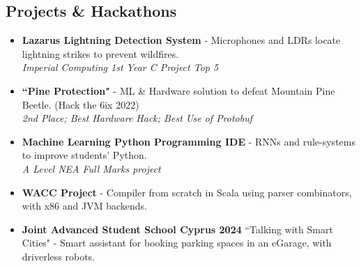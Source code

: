 \documentclass{Resume}
\begin{document}
		\subsection{Projects \& Hackathons}
			\begin{itemize}
   
            \item \textbf{Lazarus Lightning Detection System} - Microphones and LDRs locate lightning strikes to prevent wildfires.\\ \textit{Imperial Computing 1st Year C Project Top 5}
            
            \item \textbf{``Pine Protection"} - ML \& Hardware solution to defeat Mountain Pine Beetle. (Hack the 6ix 2022)\\ 
            \textit{2nd Place; Best Hardware Hack; Best Use of Protobuf}

            \item \textbf{Machine Learning Python Programming IDE} - RNNs and rule-systems to improve students' Python. \\ \textit{A Level NEA Full Marks project}

            \item \textbf{WACC Project} - Compiler from scratch in Scala using parser combinators, with x86 and JVM backends.

            \item \textbf{Joint Advanced Student School Cyprus 2024} ``Talking with Smart Cities" - Smart assistant for booking parking spaces in an eGarage, with driverless robots.               %

    
				
			\end{itemize}
    
\end{document}
